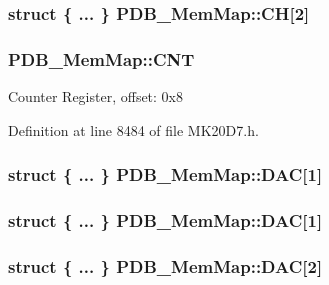 \subsubsection[{\texorpdfstring{CH}{CH}}]{\setlength{\rightskip}{0pt plus 5cm}struct \{ ... \}   P\+D\+B\+\_\+\+Mem\+Map\+::\+CH\mbox{[}2\mbox{]}}\hypertarget{struct_p_d_b___mem_map_a4003c059526ded36bec3ea279dfcdc29}{}\label{struct_p_d_b___mem_map_a4003c059526ded36bec3ea279dfcdc29}
\subsubsection[{\texorpdfstring{C\+NT}{CNT}}]{ P\+D\+B\+\_\+\+Mem\+Map\+::\+C\+NT}\hypertarget{struct_p_d_b___mem_map_a2e90754ac53cdee38eec08416fee494e}{}\label{struct_p_d_b___mem_map_a2e90754ac53cdee38eec08416fee494e}
Counter Register, offset\+: 0x8 

Definition at line 8484 of file M\+K20\+D7.\+h.

\subsubsection[{\texorpdfstring{D\+AC}{DAC}}]{\setlength{\rightskip}{0pt plus 5cm}struct \{ ... \}   P\+D\+B\+\_\+\+Mem\+Map\+::\+D\+AC\mbox{[}1\mbox{]}}\hypertarget{struct_p_d_b___mem_map_aefc62f60a83a84d98a8a2ee623c8b4af}{}\label{struct_p_d_b___mem_map_aefc62f60a83a84d98a8a2ee623c8b4af}
\subsubsection[{\texorpdfstring{D\+AC}{DAC}}]{\setlength{\rightskip}{0pt plus 5cm}struct \{ ... \}   P\+D\+B\+\_\+\+Mem\+Map\+::\+D\+AC\mbox{[}1\mbox{]}}\hypertarget{struct_p_d_b___mem_map_aa14f403d5067a3dc4b47cc19c7368efa}{}\label{struct_p_d_b___mem_map_aa14f403d5067a3dc4b47cc19c7368efa}
\subsubsection[{\texorpdfstring{D\+AC}{DAC}}]{\setlength{\rightskip}{0pt plus 5cm}struct \{ ... \}   P\+D\+B\+\_\+\+Mem\+Map\+::\+D\+AC\mbox{[}2\mbox{]}}\hypertarget{struct_p_d_b___mem_map_a64d6c047946400fd038a759a138afca7}{}\label{struct_p_d_b___mem_map_a64d6c047946400fd038a759a138afca7}
